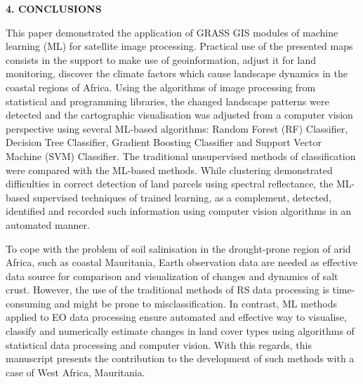 \documentclass[12pt,a4paper,oneside]{article}
\def \newsection{\vspace{12pt}\textbf}
\def \newpar{\vspace{6pt}}
\begin{document}
\newsection {4. CONCLUSIONS}

\newpar This paper demonstrated the application of GRASS GIS modules of machine learning (ML) for satellite image processing. Practical use of the presented maps consists in the support to make use of geoinformation, adjust it for land monitoring, discover the climate factors which cause landscape dynamics in the coastal regions of Africa. Using the algorithms of image processing from statistical and programming libraries, the changed landscape patterns were detected and the cartographic visualisation was adjusted from a computer vision perspective using several ML-based algorithms: Random Forest (RF) Classifier, Decision Tree Classifier, Gradient Boosting Classifier and Support Vector Machine (SVM) Classifier. The traditional unsupervised methods of classification were compared with the ML-based methods. While clustering demonstrated difficulties in correct detection of land parcels using spectral reflectance, the ML-based supervised techniques of trained learning, as a complement, detected, identified and recorded such information using computer vision algorithms in an automated manner. 

\newpar To cope with the problem of soil salinisation in the drought-prone region of arid Africa, such as coastal Mauritania, Earth observation data are needed as effective data source for comparison and visualization of changes and dynamics of salt crust. However, the use of the traditional methods of RS data processing is time-consuming and might be prone to misclassification. In contrast, ML methods applied to EO data processing ensure automated and effective way to visualise, classify and numerically estimate changes in land cover types using algorithms of statistical data processing and computer vision. With this regards, this manuscript presents the contribution to the development of such methods with a case of West Africa, Mauritania.
\end{document}

